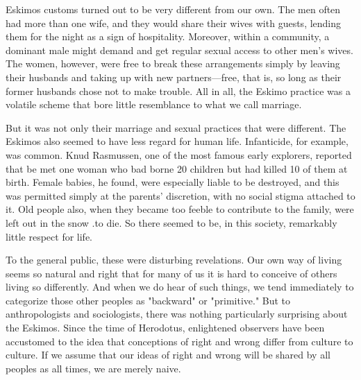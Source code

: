 Eskimos customs turned out to be very different from our own. The men 
often  had  more  than  one  wife,  and  they  would  share  their  wives  with 
guests,  lending  them  for  the  night  as  a  sign  of  hospitality.  Moreover, 
within  a  community,  a  dominant  male  might  demand  and  get  regular 
sexual access to other men's wives. The women, however, were free to 
break  these  arrangements  simply  by  leaving  their  husbands  and  taking 
up  with  new  partners—free,  that  is,  so  long  as  their  former  husbands  
chose  not  to  make  trouble.  All  in  all,  the  Eskimo  practice  was  a  volatile 
scheme that bore little resemblance to what we call marriage. 

But  it  was  not only  their  marriage  and sexual  practices  that  were 
different.  The  Eskimos also  seemed  to  have less  regard for  human  life. 
Infanticide,  for  example,  was  common.  Knud  Rasmussen,  one  of  the 
most famous early explorers, reported that be met one woman who bad 
borne  20  children  but had  killed  10  of  them  at  birth.  Female  babies,  he 
found,  were  especially  liable  to  be  destroyed,  and  this  was  permitted 
simply at the parents' discretion, with no social stigma attached to it. Old 
people  also,  when  they  became  too  feeble  to  contribute  to  the  family, 
were left out in the snow .to die. So there seemed to be, in this society, 
remarkably little respect for life. 

To the general public, these were disturbing revelations. Our own way of 
living  seems  so  natural  and  right  that  for  many  of  us  it  is  hard  to 
conceive of  others  living  so  differently.  And  when  we  do  hear  of  such 
things, we tend immediately to categorize those other peoples as 
"backward"  or  "primitive."  But  to  anthropologists  and  sociologists,  there 
was nothing particularly surprising about the Eskimos. Since the time of 
Herodotus,  enlightened  observers  have  been  accustomed  to  the  idea 
that  conceptions  of  right  and  wrong  differ  from  culture  to  culture.  If  we 
assume that our ideas of right and wrong will be shared by all peoples as 
all times, we are merely naive.


